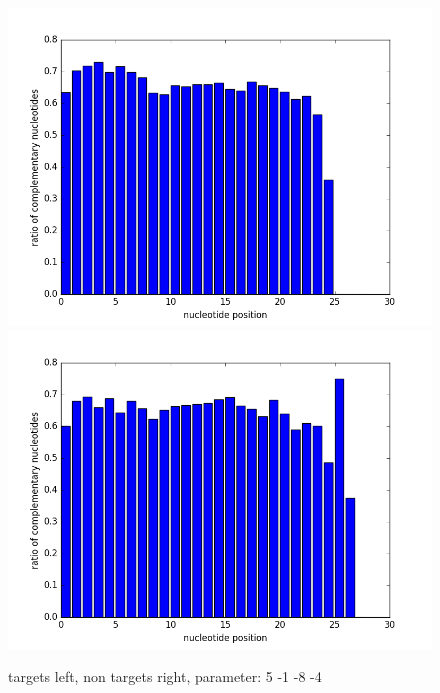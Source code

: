 \documentclass[12pt]{article}
\begin{document}
\begin{figure}
\includegraphics[scale=0.2]{results/ratio5-1-8-4.png}
\includegraphics[scale=0.2]{results/non-ratio5-1-8-4.png}
\caption {targets left, non targets right, parameter: 5 -1 -8 -4}
\label{fig:plot6}
\end{figure}
\end{document}
